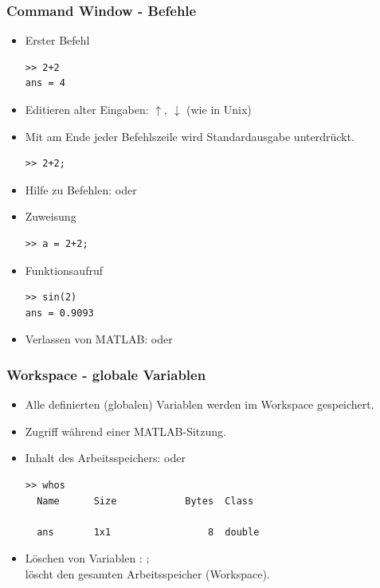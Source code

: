 \documentclass[hyperref={xetex}]{beamer}
\begin{document}
\begin{frame}[fragile]\frametitle{Command Window - Befehle }
\begin{itemize}
\item Erster Befehl
\begin{lstlisting}
>> 2+2
ans = 4
\end{lstlisting}
\item Editieren alter Eingaben:  $\uparrow$, $\downarrow$ (wie
in Unix)
\item Mit \mcode{;} am Ende jeder Befehlszeile wird Standardausgabe unterdrückt.
\begin{lstlisting}
>> 2+2;
\end{lstlisting}
\item Hilfe zu Befehlen:  oder 
\item Zuweisung 
\begin{lstlisting}
>> a = 2+2;
\end{lstlisting}
\item Funktionsaufruf 
\begin{lstlisting}
>> sin(2)
ans = 0.9093
\end{lstlisting}
\item Verlassen von MATLAB:  oder 
\end{itemize}
\end{frame}


\begin{frame}[fragile]\frametitle{Workspace - globale Variablen}
\begin{itemize}
\item Alle definierten (globalen) Variablen werden im Workspace gespeichert.
\item Zugriff während einer MATLAB-Sitzung.
\item Inhalt des Arbeitsspeichers:  oder 
\begin{lstlisting}
>> whos
  Name      Size            Bytes  Class   

  ans       1x1                 8  double    
\end{lstlisting}
\item Löschen von Variablen : ;\\
 löscht den gesamten Arbeitsspeicher (Workspace).
\end{itemize}
\end{frame}
\end{document}
